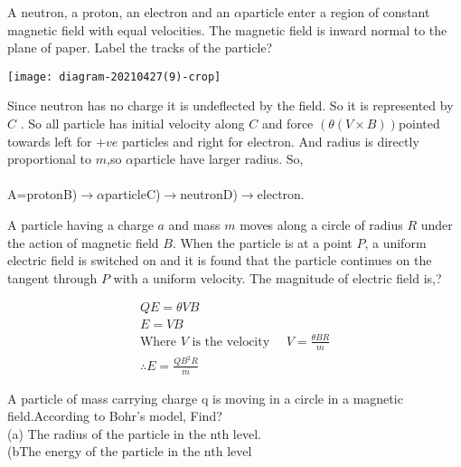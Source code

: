 	
	
\begin{exercise}
	A neutron, a proton, an electron and an $\alpha$particle enter a region of constant magnetic field with equal velocities. The magnetic field is inward normal to the plane of paper. Label the tracks of the particle?\\
	\begin{minipage}{.45\textwidth}
		\begin{center}
			\texttt{[image: diagram-20210427(9)-crop]}
		\end{center}
	\end{minipage}
\end{exercise}
\begin{answer}
	Since neutron has no charge it is undeflected by the field. So it is represented by $C$ . So all particle has initial velocity along $C$ and force $( \theta(V\times B))$pointed towards left for $+ve$ particles and right for electron. And radius is directly proportional to $m$,so $\alpha$particle have larger radius. So,\\\\
	A=proton\quad B)$\rightarrow$$\alpha$particle\quad C)$\rightarrow$neutron\quad D)$\rightarrow$electron.
\end{answer}
\begin{exercise}
	A particle having a charge $a$ and mass $m$ moves along a circle of radius $R$ under the action of magnetic field $B$. When the particle is at a point $P$, a uniform electric field is switched on and it is found that the particle continues on the tangent through $P$ with a uniform velocity. The magnitude of electric field is,?
\end{exercise}
\begin{answer}
	\begin{align*}
	Q E=\theta VB\\
	E=VB\\
	\text{Where $V$ is the velocity }\quad V=\frac{\theta BR}{m}\\
	\therefore E=\frac{QB^2R}{m}
	\end{align*}
\end{answer}
\begin{exercise}
	A particle of mass carrying charge q is moving in a circle in a magnetic field.According to Bohr's model, Find?\\
	(a) The radius of the particle in the nth level.\\
	(bThe energy of the particle in the nth level
\end{exercise}
